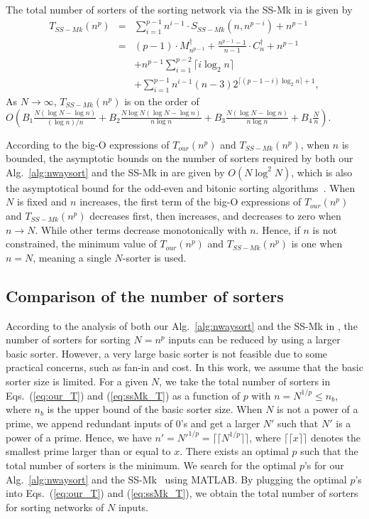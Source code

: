 \documentclass[10pt,journal,cspaper,compsoc]{IEEEtran}
\begin{document}
The total number of sorters of the sorting network via the SS-Mk in \cite{gao1997sloping} is given by
\begin{equation}
\begin{array}{rcl}
T_{SS-Mk}(n^p) &=& \sum^{p-1}_{i=1} n^{i-1} \cdot S_{SS-Mk}(n,n^{p-i}) + n^{p-1}\\
&=& (p-1)\cdot M^\dagger_{n^{p-1}} + \frac{n^{p-1} - 1}{n-1} \cdot C^\dagger_n  + n^{p-1} \\
& & + n^{p-1}\sum^{p-2}_{i=1}\lceil i \log_2 n \rceil \\
& & + \sum^{p-1}_{i=1} n^{i-1}(n-3)2^{\lceil (p-1-i) \log_2 n \rceil + 1},
\end{array}
\label{eq:ssMk_T}
\end{equation}
As $N \rightarrow \infty$, $T_{SS-Mk}(n^p)$ is on the order of $O(B_1 \frac{N(\log N - \log n)}{(\log n) /n} + B_2 \frac{N \log N (\log N -\log n)}{n \log n} + B_3 \frac{N (\log N -\log n)}{n \log n} + B_4 \frac{N}{n})$.


According to the big-O expressions of $T_{our}(n^p)$ and $T_{SS-Mk}(n^p)$, when $n$ is bounded, the asymptotic bounds on the number of sorters required by both our Alg.~\ref{alg:nwaysort} and the SS-Mk in \cite{gao1997sloping} are given by $O(N \log^2 N)$, which is also the asymptotical bound for the odd-even and bitonic sorting algorithms~\cite{Bat68sorting, batcher1990bitonic}.
When $N$ is fixed and $n$ increases, the first term of the big-O expressions of $T_{our}(n^p)$ and $T_{SS-Mk}(n^p)$ decreases first, then increases, and decreases to zero when $n \rightarrow N$. While other terms decrease monotonically with $n$. Hence, if $n$ is not constrained, the minimum value of $T_{our}(n^p)$ and $T_{SS-Mk}(n^p)$ is one when $n=N$, meaning a single $N$-sorter is used.

\subsection{Comparison of the number of sorters}
\label{sec:comp}
According to the analysis of both our Alg.~\ref{alg:nwaysort} and the SS-Mk in \cite{gao1997sloping}, the number of sorters for sorting $N=n^p$ inputs can be reduced by using a larger basic sorter. However, a very large basic sorter is not feasible due to some practical concerns, such as fan-in and cost. In this work, we assume that the basic sorter size is limited.
For a given $N$, we take the total number of sorters in Eqs.~(\ref{eq:our_T}) and (\ref{eq:ssMk_T}) as a function of $p$ with $n=N^{1/p} \le n_b$, where $n_b$ is the upper bound of the basic sorter size.
When $N$ is not a power of a prime, we append redundant inputs of 0's and get a larger $N'$ such that $N'$ is a power of a prime. Hence, we have $n'= N'^{1/p} = \lceil\lceil N^{1/p} \rceil \rceil$, where $\lceil \lceil x \rceil \rceil$ denotes the smallest prime larger than or equal to $x$.
There exists an optimal $p$ such that the total number of sorters is the minimum.
We search for the optimal $p$'s for our Alg.~\ref{alg:nwaysort} and the SS-Mk~\cite{gao1997sloping} using MATLAB. By plugging the optimal $p$'s into Eqs.~(\ref{eq:our_T}) and (\ref{eq:ssMk_T}), we obtain the total number of sorters for sorting networks of $N$ inputs.
\end{document}
